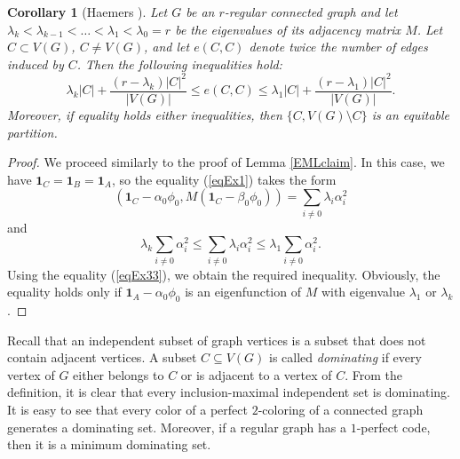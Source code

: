 \documentclass[11pt]{article}
\newtheorem{corollary}{Corollary}[section]
\theoremstyle{definition}
\begin{document}
\begin{corollary}[Haemers \cite{Haemers}]\label{haemers}
Let $G$ be an $r$-regular connected graph and let
$\lambda_k<\lambda_{k-1}<\dots<\lambda_{1}<\lambda_0=r$
be the eigenvalues of its adjacency matrix $M$. Let $C\subset
V(G)$, $C\neq V(G)$, and let $e(C,C)$ denote twice the number of edges induced by
$C$. Then the following inequalities hold:
$$ \lambda_k|C|+\frac{(r-\lambda_k)|C|^2}{|V(G)|}\leq e(C,C)\leq
\lambda_1|C|+\frac{(r-\lambda_1)|C|^2}{|V(G)|}.$$
Moreover, if equality holds  either inequalities, then $\{C, V(G)\setminus C\}$ is an equitable partition. 
\end{corollary}
\begin{proof}
We proceed similarly to the proof of Lemma \ref{EMLclaim}. In this
case, we have ${\mathbf 1}_{C}={\mathbf 1}_{B}={\mathbf 1}_{A}$, so the equality
(\ref{eqEx1}) takes the form $$({\mathbf 1}_{C}-\alpha_0\phi_0,
M({\mathbf 1}_{C}-\beta_0\phi_0))= \sum\limits_{i\neq
0}\lambda_i\alpha_i^2$$ and $$\lambda_k\sum\limits_{i\neq
0}\alpha_i^2\leq \sum\limits_{i\neq 0}\lambda_i\alpha_i^2\leq
\lambda_1\sum\limits_{i\neq 0}\alpha_i^2.$$ Using the equality
(\ref{eqEx33}), we obtain the required inequality. Obviously, the equality holds only if
${\mathbf 1}_{A}-\alpha_0\phi_0$ is an eigenfunction of  $M$
with eigenvalue $\lambda_1$ or $\lambda_k$.
\end{proof}

Recall that
an independent subset of graph vertices is a subset that does not
contain adjacent vertices.
A subset  $C\subseteq V(G)$  is called
{\sl dominating} if every vertex of $G$  either belongs to $C$ or
is adjacent to a vertex of $C$.
From the definition, it is clear that every inclusion-maximal independent set is dominating.
It is easy to see that every color of a perfect $2$-coloring of a connected graph generates a dominating set.
Moreover, if a regular graph has a
$1$-perfect code, then it is a minimum dominating
set.
\end{document}
